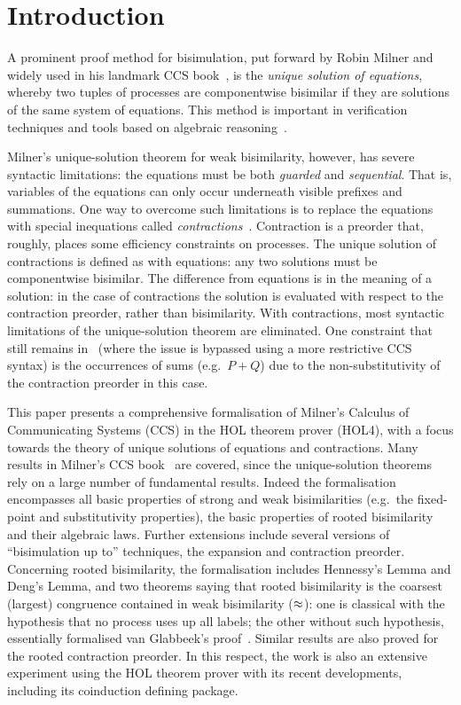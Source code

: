 \section{Introduction}

A prominent proof method for bisimulation, put forward by Robin Milner and widely used in his
landmark CCS book~\cite{Mil89}, is the
\emph{unique solution of equations}, whereby two tuples of processes are
componentwise bisimilar if they are solutions of the same system of equations.
This method is important in verification techniques and tools
based on algebraic reasoning~\cite{BaeBOOK,theoryAndPractice,RosUnder10}. 

Milner's unique-solution theorem for weak bisimilarity, however,
has severe syntactic limitations:
the equations must be both \emph{guarded} and \emph{sequential}. That is,
variables of the equations can only occur underneath visible prefixes and summations.
One way to overcome such limitations is to replace the equations
with special inequations called
\emph{contractions}~\cite{sangiorgi2015equations,sangiorgi2017equations}. Contraction is a
preorder that, roughly, places some efficiency constraints on processes.
The unique solution of contractions is defined as with equations:
any two solutions must be componentwise bisimilar.
The difference from equations is in the meaning of a solution:
in the case of contractions the solution is evaluated with respect to
the contraction preorder, rather than bisimilarity. 
With contractions, most syntactic limitations of the unique-solution theorem are
eliminated. One constraint that still remains
in~\cite{sangiorgi2017equations}
(where the issue is bypassed using a more
restrictive CCS syntax)
is the occurrences of sums (e.g.~$P + Q$) due to
the non-substitutivity of the contraction preorder in this case.

This paper presents a comprehensive formalisation of Milner's Calculus of Communicating
Systems (CCS) in the HOL theorem prover (HOL4),
with a focus towards the theory of unique solutions of equations and contractions.
Many results in Milner's CCS book~\cite{Mil89} are covered, since
the unique-solution theorems rely on a large number of fundamental results.
Indeed the formalisation encompasses all basic properties of strong and weak
bisimilarities (e.g.~the fixed-point and substitutivity properties), the
basic properties of rooted bisimilarity and their algebraic laws.
Further extensions include several versions of ``bisimulation up to''
techniques, the expansion and contraction preorder.
Concerning rooted bisimilarity, the formalisation
includes Hennessy's Lemma and Deng's Lemma,
 and two theorems saying that rooted bisimilarity is the coarsest (largest)
 congruence contained in weak bisimilarity ($\approx$): one is classical
 with the hypothesis that no process uses up all labels;
the other without such hypothesis, essentially formalised van Glabbeek's proof~\cite{van2005characterisation}.
Similar results are also proved for the rooted contraction preorder.
In this respect, the work is also an extensive experiment using the HOL theorem prover with its
recent developments, including its coinduction defining package.

